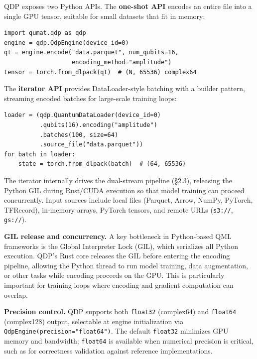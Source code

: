 \documentclass[sigconf, nonacm]{acmart}
\begin{document}
QDP exposes two Python APIs. The \textbf{one-shot API} encodes an entire file into a single GPU tensor, suitable for small datasets that fit in memory:

\begin{lstlisting}
import qumat.qdp as qdp
engine = qdp.QdpEngine(device_id=0)
qt = engine.encode("data.parquet", num_qubits=16,
                   encoding_method="amplitude")
tensor = torch.from_dlpack(qt)  # (N, 65536) complex64
\end{lstlisting}

\noindent The \textbf{iterator API} provides DataLoader-style batching with a builder pattern, streaming encoded batches for large-scale training loops:

\begin{lstlisting}
loader = (qdp.QuantumDataLoader(device_id=0)
          .qubits(16).encoding("amplitude")
          .batches(100, size=64)
          .source_file("data.parquet"))
for batch in loader:
    state = torch.from_dlpack(batch)  # (64, 65536)
\end{lstlisting}

\noindent The iterator internally drives the dual-stream pipeline (\S2.3), releasing the Python GIL during Rust/CUDA execution so that model training can proceed concurrently.
Input sources include local files (Parquet, Arrow, NumPy, PyTorch, TFRecord), in-memory arrays, PyTorch tensors, and remote URLs (\texttt{s3://}, \texttt{gs://}).

\textbf{GIL release and concurrency.}
A key bottleneck in Python-based QML frameworks is the Global Interpreter Lock (GIL), which serializes all Python execution.
QDP's Rust core releases the GIL before entering the encoding pipeline, allowing the Python thread to run model training, data augmentation, or other tasks while encoding proceeds on the GPU.
This is particularly important for training loops where encoding and gradient computation can overlap.

\textbf{Precision control.}
QDP supports both \texttt{float32} (complex64) and \texttt{float64} (complex128) output, selectable at engine initialization via \texttt{QdpEngine(precision="float64")}.
The default \texttt{float32} minimizes GPU memory and bandwidth; \texttt{float64} is available when numerical precision is critical, such as for correctness validation against reference implementations.

\end{document}
